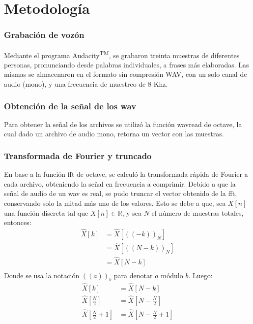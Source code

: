 \documentclass[a4paper,11pt]{article}
\begin{document}
\section{Metodolog\'ia}
\begin{comment}
[Hay que relatar los pasos que se fueron realizando, incluyendo los modelos
utilizados, los analisis hechos, las pruebas realizadas.]
\end{comment}
\subsubsection{Grabación de voz\'on}
Mediante el programa Audacity\textsuperscript{TM}, se grabaron treinta muestras
de diferentes personas, pronunciando desde palabras individuales, a frases más
elaboradas. Las mismas se almacenaron en el formato sin compresión WAV, con un
solo canal de audio (mono), y una frecuencia de muestreo de $8$ Khz.
\subsubsection{Obtención de la señal de los wav}
Para obtener la señal de los archivos se utilizó la función wavread de octave,
la cual dado un archivo de audio mono, retorna un vector con las muestras.
\subsubsection{Transformada de Fourier y truncado}
En base a la función fft de octave, se calculó la transformada rápida de
Fourier a cada archivo, obteniendo la señal en frecuencia a comprimir.
Debido a que la señal de audio de un wav es real, se pudo truncar el vector
obtenido de la fft, conservando solo la mitad más uno de los valores. Esto se
debe a que, sea $X[n]$ una función discreta tal que $X[n] \in
\mathbb{R}$, y sea $N$ el número de muestras totales, entonces:
\begin{equation} \label{eq1}
    \begin{split}
        \hat{X}[k] & = \hat{X}[((-k))_N] \\
         & = \hat{X}[((N - k))_N] \\
         & = \hat{X}[N-k] \\
     \end{split}
\end{equation}
Donde se usa la notación $((a))_b$ para denotar $a$ módulo $b$.
Luego:
\begin{equation} \label{eq2}
    \begin{split}
        \hat{X}[k] & = \hat{X}[N-k] \\
        \hat{X}[\frac{N}{2}] & = \hat{X}[N-\frac{N}{2}] \\
        \hat{X}[\frac{N}{2}+1] & = \hat{X}[N-\frac{N}{2}+1] \\
     \end{split}
\end{equation}
\end{document}
